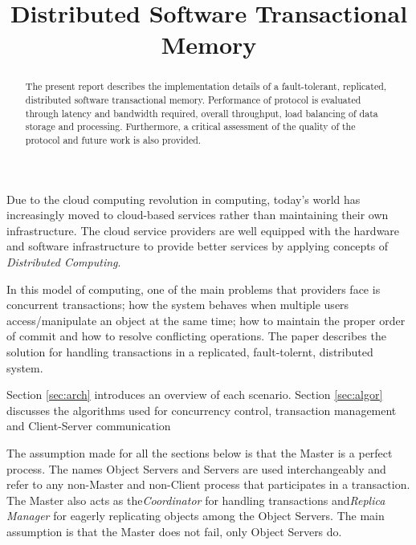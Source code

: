 \documentclass[times, 10pt,twocolumn]{article}
\begin{document}
\title{Distributed Software Transactional Memory}

\maketitle
\thispagestyle{empty}

\begin{abstract}
   The present report describes the implementation details of a fault-tolerant,
   replicated, distributed software transactional memory. Performance of protocol is
   evaluated through latency and bandwidth required, overall throughput, load balancing
   of data storage and processing.
   Furthermore, a critical assessment of the quality of the protocol and future work is 
   also provided. 
\end{abstract}

Due to the cloud computing revolution in computing, 
today’s world has increasingly moved to cloud-based services rather than maintaining their 
own infrastructure. The cloud service providers are well equipped with the hardware and
 software infrastructure to provide better services by applying concepts of {\it Distributed Computing}. 

In this model of computing, one of the main problems that providers face is concurrent transactions;
 how the system behaves when multiple users access/manipulate an object at the same time; how to maintain 
the proper order of commit and how to resolve conflicting operations. 
The paper describes the solution for handling transactions in a replicated, fault-tolernt, distributed system. 

Section \ref{sec:arch} introduces an overview of each scenario. Section 
\ref{sec:algor} discusses the algorithms used for concurrency control, 
transaction management and Client-Server communication


\label{sec:arch}

The assumption made for all the sections below is that the Master is a perfect process. 
The names Object Servers and Servers are used interchangeably and refer to any non-Master and non-Client process
 that participates in a transaction.
The Master also acts as the{\it Coordinator} for handling transactions and{\it Replica Manager} for eagerly replicating
objects among the Object Servers. The main assumption is that the Master does not fail, only Object Servers do.
\end{document}
